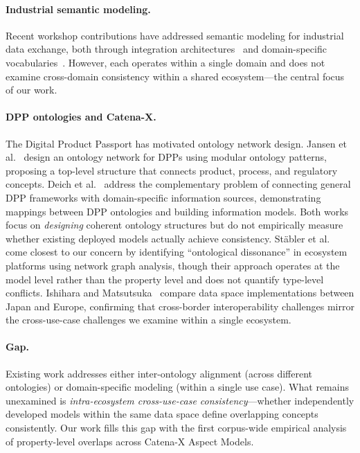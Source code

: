 \documentclass[]{ceurart}
\begin{document}
\paragraph{Industrial semantic modeling.}
Recent workshop contributions have addressed semantic modeling for
industrial data exchange, both through integration
architectures~\cite{grangel2023datamesh, milicicbrandt2023imf} and
domain-specific vocabularies~\cite{tsalapati2023shm, yahya2023camcont,
kebede2024semantic}. However, each operates within a single domain and
does not examine cross-domain consistency within a shared
ecosystem---the central focus of our work.

\paragraph{DPP ontologies and Catena-X.}
The Digital Product Passport has motivated ontology network design.
Jansen et al.~\cite{jansen2024designing} design an ontology network for
DPPs using modular ontology patterns, proposing a top-level structure
that connects product, process, and regulatory concepts. Deich et
al.~\cite{deich2025dpp} address the complementary problem of connecting
general DPP frameworks with domain-specific information sources,
demonstrating mappings between DPP ontologies and building information
models. Both works focus on \emph{designing} coherent ontology structures
but do not empirically measure whether existing deployed models actually
achieve consistency. St\"{a}bler et al.~\cite{staebler2023amcis} come
closest to our concern by identifying ``ontological dissonance'' in
ecosystem platforms using network graph analysis, though their approach
operates at the model level rather than the property level and does not
quantify type-level conflicts. Ishihara and
Matsutsuka~\cite{ishihara2025interoperable} compare data space
implementations between Japan and Europe, confirming that cross-border
interoperability challenges mirror the cross-use-case challenges we
examine within a single ecosystem.

\paragraph{Gap.}
Existing work addresses either inter-ontology alignment (across different
ontologies) or domain-specific modeling (within a single use case).
What remains unexamined is \emph{intra-ecosystem cross-use-case
consistency}---whether independently developed models within the same
data space define overlapping concepts consistently. Our work fills this
gap with the first corpus-wide empirical analysis of property-level
overlaps across Catena-X Aspect Models.
\end{document}
